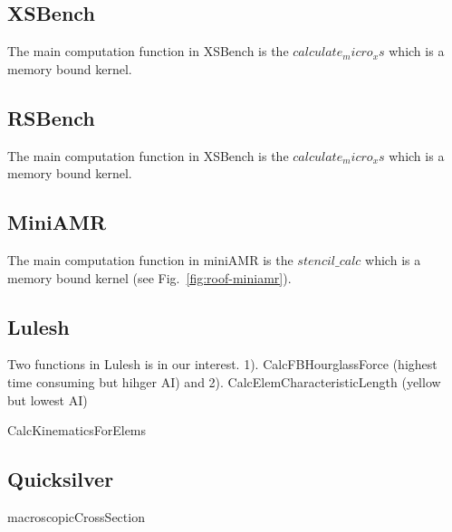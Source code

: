 \subsection{XSBench}
The main computation function in XSBench is the $calculate_micro_xs$  which is a memory bound kernel. 

\subsection{RSBench}
The main computation function in XSBench is the $calculate_micro_xs$  which is a memory bound kernel. 


\subsection{MiniAMR}
The main computation function in miniAMR is the $stencil\_calc$  which is a memory bound kernel (see Fig.~\ref{fig:roof-miniamr}). 

\subsection{Lulesh}
Two functions in Lulesh is in our interest. 1). CalcFBHourglassForce (highest time consuming but hihger AI) and 2). CalcElemCharacteristicLength (yellow but lowest AI)

CalcKinematicsForElems



\subsection{Quicksilver}
macroscopicCrossSection

